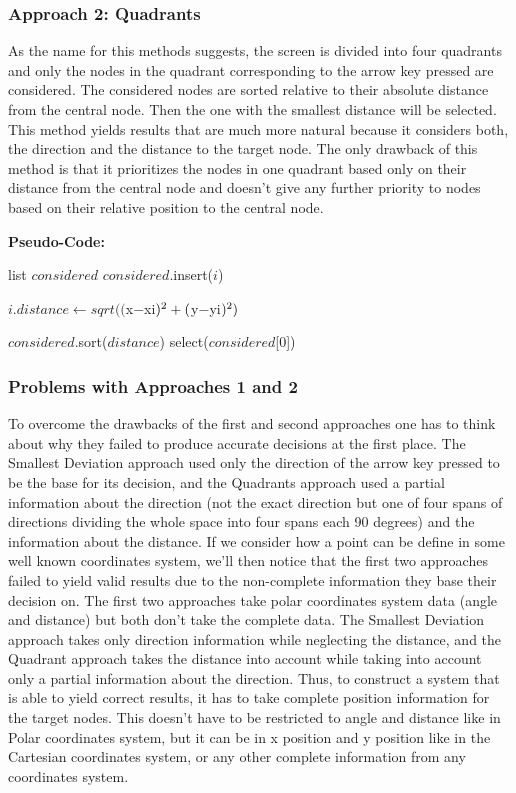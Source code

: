 \subsubsection{Approach 2: Quadrants}
As the name for this methods suggests, the screen is divided into four quadrants and only the nodes in the quadrant corresponding to the arrow key pressed are considered. The considered nodes are sorted relative to their absolute distance from the central node. Then the one with the smallest distance will be selected. This method yields results that are much more natural because it considers both, the direction and the distance to the target node. The only drawback of this method is that it prioritizes the nodes in one quadrant based only on their distance from the central node and doesn't give any further priority to nodes based on their relative position to the central node. %
\begin{spacing}{2}\end{spacing}
\noindent
{\bf Pseudo-Code:}
\par
\begin{algorithmic}
\STATE list $considered$
		\STATE $considered$.insert($i$)
	\ENDIF
\ENDFOR

	\STATE $i.distance\gets sqrt(($x$-$xi$)^{\textnormal{2}}+($y$-$yi$)^{\textnormal{2}})$
\ENDFOR

\STATE $considered$.sort($distance$)
\STATE select($considered$[0])
\end{algorithmic}

\subsubsection{Problems with Approaches 1 and 2}
To overcome the drawbacks of the first and second approaches one has to think about why they failed to produce accurate decisions at the first place. The Smallest Deviation approach used only the direction of the arrow key pressed to be the base for its decision, and the Quadrants approach used a partial information about the direction (not the exact direction but one of four spans of directions dividing the whole space into four spans each 90 degrees) and the information about the distance. If we consider how a point can be define in some well known coordinates system, we'll then notice that the first two approaches failed to yield valid results due to the non-complete information they base their decision on. The first two approaches take polar coordinates system data (angle and distance) but both don't take the complete data. The Smallest Deviation approach takes only direction information while neglecting the distance, and the Quadrant approach takes the distance into account while taking into account only a partial information about the direction. Thus, to construct a system that is able to yield correct results, it has to take complete position information for the target nodes. This doesn't have to be restricted to angle and distance like in Polar coordinates system, but it can be in x position and y position like in the Cartesian coordinates system, or any other complete information from any coordinates system.

